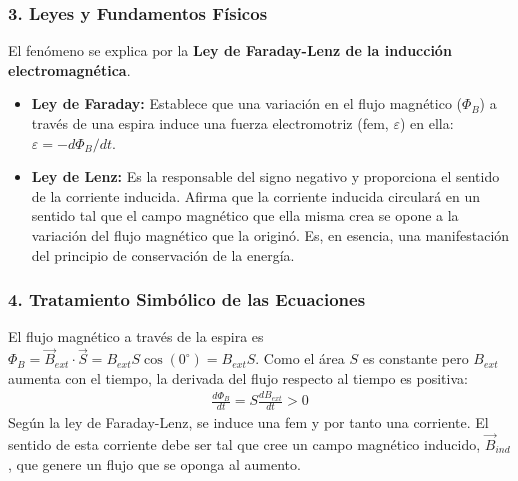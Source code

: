 \subsubsection*{3. Leyes y Fundamentos Físicos}
El fenómeno se explica por la \textbf{Ley de Faraday-Lenz de la inducción electromagnética}.
\begin{itemize}
    \item \textbf{Ley de Faraday:} Establece que una variación en el flujo magnético ($\Phi_B$) a través de una espira induce una fuerza electromotriz (fem, $\varepsilon$) en ella: $\varepsilon = -d\Phi_B/dt$.
    \item \textbf{Ley de Lenz:} Es la responsable del signo negativo y proporciona el sentido de la corriente inducida. Afirma que la corriente inducida circulará en un sentido tal que el campo magnético que ella misma crea se opone a la variación del flujo magnético que la originó. Es, en esencia, una manifestación del principio de conservación de la energía.
\end{itemize}

\subsubsection*{4. Tratamiento Simbólico de las Ecuaciones}
El flujo magnético a través de la espira es $\Phi_B = \vec{B}_{ext} \cdot \vec{S} = B_{ext} S \cos(0^\circ) = B_{ext} S$.
Como el área $S$ es constante pero $B_{ext}$ aumenta con el tiempo, la derivada del flujo respecto al tiempo es positiva:
\begin{gather}
    \frac{d\Phi_B}{dt} = S \frac{dB_{ext}}{dt} > 0
\end{gather}
Según la ley de Faraday-Lenz, se induce una fem y por tanto una corriente. El sentido de esta corriente debe ser tal que cree un campo magnético inducido, $\vec{B}_{ind}$, que genere un flujo que se oponga al aumento.

